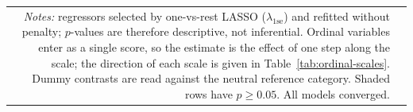 \begin{landscape}
\begin{longtable}{r l l l r r r r r c}
\multicolumn{9}{p{0.95\linewidth}}{\footnotesize \emph{Notes:} regressors selected by one-vs-rest LASSO ($\lambda_{1\text{se}}$) and refitted without penalty; $p$-values are therefore descriptive, not inferential. Ordinal variables enter as a single score, so the estimate is the effect of one step along the scale; the direction of each scale is given in Table~\ref{tab:ordinal-scales}. Dummy contrasts are read against the neutral reference category. Shaded rows have $p \geq 0.05$. All models converged.}\\
\end{longtable}
\endgroup
\end{landscape}
